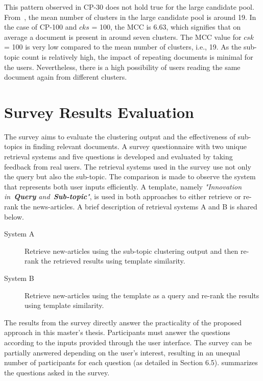 This pattern observed in CP-30 does not hold true for the large candidate pool. From~, the mean number of clusters in the large candidate pool is around 19. In the case of CP-100 and $cks$ = 100, the \ac{MCC} is 6.63, which signifies that on average a document is present in around seven clusters. The \ac{MCC} value for $csk$ = 100 is very low compared to the mean number of clusters, i.e., 19. As the sub-topic count is relatively high, the impact of repeating documents is minimal for the users. Nevertheless, there is a high possibility of users reading the same document again from different clusters.



\section{Survey Results Evaluation}

The survey aims to evaluate the clustering output and the effectiveness of sub-topics in finding relevant documents. A survey questionnaire with two unique retrieval systems and five questions is developed and evaluated by taking feedback from real users. The retrieval systems used in the survey use not only the query but also the sub-topic. The comparison is made to observe the system that represents both user inputs efficiently. A template, namely \textit{"Innovation in~\textbf{Query} and~\textbf{Sub-topic}"}, is used in both approaches to either retrieve or re-rank the news-articles. A brief description of retrieval systems A and B is shared below.

\begin{description}
	\item[System A] Retrieve new-articles using the sub-topic clustering output and then re-rank the retrieved results using template similarity.
	
	\item[System B] Retrieve new-articles using the template as a query and re-rank the results using template similarity.
\end{description}

The results from the survey directly answer the practicality of the proposed approach in this master's thesis. Participants must answer the questions according to the inputs provided through the user interface. The survey can be partially answered depending on the user's interest, resulting in an unequal number of participants for each question (as detailed in Section 6.5).  summarizes the questions asked in the survey.



